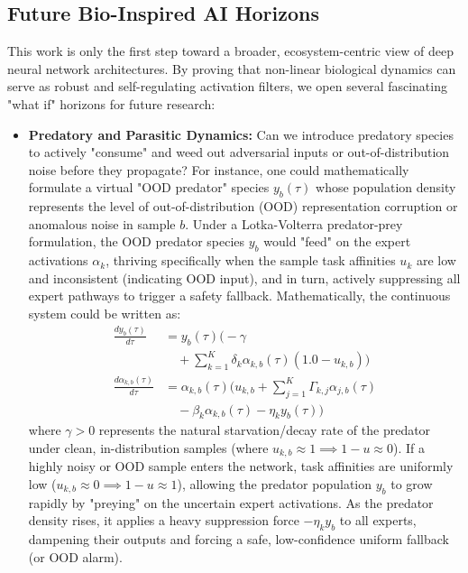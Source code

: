 \subsection{Future Bio-Inspired AI Horizons}
\label{subsec:future_horizons}
This work is only the first step toward a broader, ecosystem-centric view of deep neural network architectures. By proving that non-linear biological dynamics can serve as robust and self-regulating activation filters, we open several fascinating "what if" horizons for future research:
\begin{itemize}
    \item \textbf{Predatory and Parasitic Dynamics:} Can we introduce predatory species to actively "consume" and weed out adversarial inputs or out-of-distribution noise before they propagate? For instance, one could mathematically formulate a virtual "OOD predator" species $y_b(\tau)$ whose population density represents the level of out-of-distribution (OOD) representation corruption or anomalous noise in sample $b$. Under a Lotka-Volterra predator-prey formulation, the OOD predator species $y_b$ would "feed" on the expert activations $\alpha_k$, thriving specifically when the sample task affinities $u_k$ are low and inconsistent (indicating OOD input), and in turn, actively suppressing all expert pathways to trigger a safety fallback. Mathematically, the continuous system could be written as:
    \begin{align}
        \frac{d y_b(\tau)}{d \tau} &= y_b(\tau) \Big( -\gamma \nonumber \\
        &\quad + \sum_{k=1}^K \delta_k \alpha_{k, b}(\tau) (1.0 - u_{k, b}) \Big) \\
        \frac{d \alpha_{k, b}(\tau)}{d \tau} &= \alpha_{k, b}(\tau) \Big( u_{k, b} + \sum_{j=1}^K \Gamma_{k, j} \alpha_{j, b}(\tau) \nonumber \\
        &\quad - \beta_k \alpha_{k, b}(\tau) - \eta_k y_b(\tau) \Big)
    \end{align}
    where $\gamma > 0$ represents the natural starvation/decay rate of the predator under clean, in-distribution samples (where $u_{k, b} \approx 1 \implies 1 - u \approx 0$). If a highly noisy or OOD sample enters the network, task affinities are uniformly low ($u_{k, b} \approx 0 \implies 1 - u \approx 1$), allowing the predator population $y_b$ to grow rapidly by "preying" on the uncertain expert activations. As the predator density rises, it applies a heavy suppression force $-\eta_k y_b$ to all experts, dampening their outputs and forcing a safe, low-confidence uniform fallback (or OOD alarm). 
    

\end{itemize}
